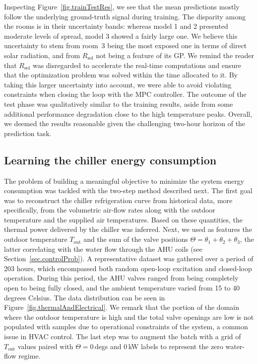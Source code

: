 Inspecting Figure~\ref{fig.trainTestRes}, we see that the mean predictions mostly follow the underlying ground-truth signal during training. The disparity among the rooms is in their uncertainty bands: whereas model 1 and 2 presented moderate levels of spread, model 3 showed a fairly large one. We believe this uncertainty to stem from room~3 being the most exposed one in terms of direct solar radiation, and from $R_\text{sol}$ not being a feature of its GP. We remind the reader that $R_\text{sol}$ was disregarded to accelerate the real-time computations and ensure that the optimization problem was solved within the time allocated to it. By taking this larger uncertainty into account, we were able to avoid violating constraints when closing the loop with the MPC controller. The outcome of the test phase was qualitatively similar to the training results, aside from some additional performance degradation close to the high temperature peaks. Overall, we deemed the results reasonable given the challenging two-hour horizon of the prediction task.

\subsection{Learning the chiller energy consumption}
\label{sec:learningChiller}

The problem of building a meaningful objective to minimize the system energy consumption was tackled with the two-step method described next. The first goal was to reconstruct the chiller refrigeration curve from historical data, more specifically, from the volumetric air-flow rates along with the outdoor temperature and the supplied air temperatures. Based on these quantities, the thermal power delivered by the chiller was inferred. Next, we used as features the outdoor temperature $T_\text{out}$ and the sum of the valve positions $\Theta = \theta_1 + \theta_2 + \theta_3$, the latter correlating with the water flow through the AHU coils (see Section~\ref{sec.controlProb}). A representative dataset was gathered over a period of 203 hours, which encompassed both random open-loop excitation and closed-loop operation. During this period, the AHU valves ranged from being completely open to being fully closed, and the ambient temperature varied from 15 to 40 degrees Celsius. The data distribution can be seen in Figure~\ref{fig.thermalAndElectrical}. We remark that the portion of the domain where the outdoor temperature is high and the total valve openings are low is not populated with samples due to operational constraints of the system, a common issue in HVAC control. The last step was to augment the batch with a grid of $T_\text{out}$ values paired with $\Theta=0\,$degs and $0\,$kW labels to represent the zero water-flow regime.

